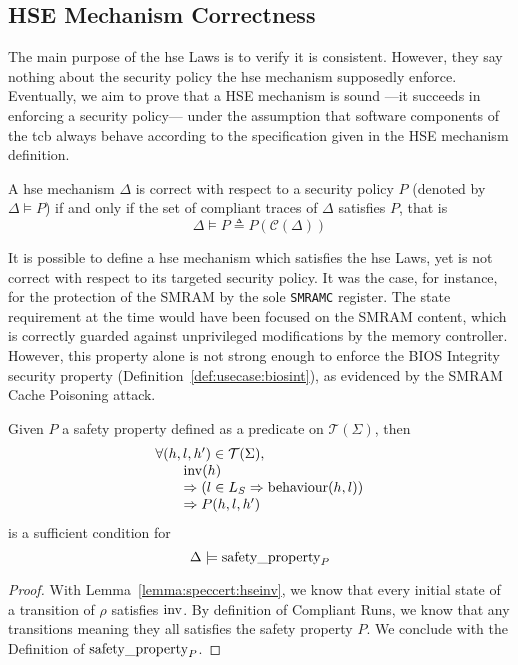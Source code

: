 \subsection{HSE Mechanism Correctness}
\label{subsec:speccert:correct}

The main purpose of the \ac{hse} Laws is to verify it is consistent.
%
However, they say nothing about the security policy the \ac{hse} mechanism
supposedly enforce.
%
Eventually, we aim to prove that a HSE mechanism is sound ---it succeeds in
enforcing a security policy--- under the assumption that software components of
the \ac{tcb} always behave according to the specification given in the HSE
mechanism definition.

\begin{definition}
  A \ac{hse} mechanism $\Delta$ is correct with respect to a security policy $P$
  (denoted by $\Delta \models P$) if and only if the set of compliant traces of
  $\Delta$ satisfies $P$, that is
  \[
    \Delta \models P \triangleq P(\mathcal{C}(\Delta))
  \]
\end{definition}

It is possible to define a \ac{hse} mechanism which satisfies the \ac{hse} Laws,
yet is not correct with respect to its targeted security policy.
%
It was the case, for instance, for the protection of the SMRAM by the sole
\texttt{SMRAMC} register.
%
The state requirement at the time would have been focused on the SMRAM content,
which is correctly guarded against unprivileged modifications by the memory
controller.
%
However, this property alone is not strong enough to enforce the BIOS Integrity
security property (Definition~\ref{def:usecase:biosint}), as evidenced by the
SMRAM Cache Poisoning attack.

\begin{theorem}
  \label{theorem:speccert:correcthse}
  Given $P$ a safety property defined as a predicate on $\mathcal{T}(\Sigma)$,
  then
  \[
    \begin{array}{l}
      \forall (h, l, h') \in \mathcal{T}(\Sigma), \\
      \qquad \mathrm{inv}(h) \\
      \qquad \Rightarrow (l \in L_{S} \Rightarrow \mathrm{behaviour}(h, l))\\
      \qquad \Rightarrow P(h, l, h')
    \end{array}
  \]
  is a sufficient condition for
  \[
    \Delta \models \mathrm{safety\_property}_{P}
  \]

  \begin{proof}
    With Lemma~\ref{lemma:speccert:hseinv}, we know that every initial state of
    a transition of $\rho$ satisfies $\mathrm{inv}$.
    By definition of Compliant Runs, we know that any transitions meaning they
    all satisfies the safety property $P$.
    We conclude with the Definition of $\mathrm{safety\_property}_{P}$.
  \end{proof}
\end{theorem}

